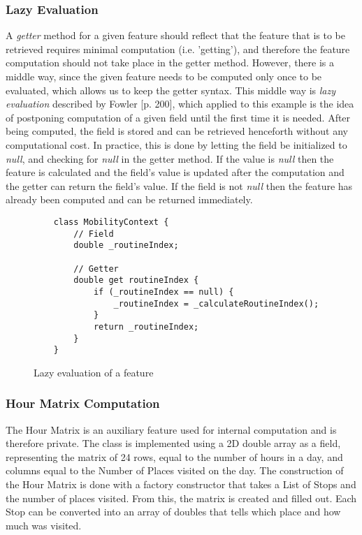 \subsubsection{Lazy Evaluation}
A \textit{getter} method for a given feature should reflect that the feature that is to be retrieved requires minimal computation (i.e. 'getting'), and therefore the feature computation should not take place in the getter method. However, there is a middle way, since the given feature needs to be computed only once to be evaluated, which allows us to keep the getter syntax. This middle way is \textit{lazy evaluation} described by Fowler \cite{fowler-PEEA} [p. 200], which applied to this example is the idea of postponing computation of a given field until the first time it is needed. After being computed, the field is stored and can be retrieved henceforth without any computational cost. In practice, this is done by letting the field be initialized to \textit{null}, and checking for \textit{null} in the getter method. If the value is \textit{null} then the feature is calculated and the field's value is updated after the computation and the getter can return the field's value. If the field is not \textit{null} then the feature has already been computed and can be returned immediately.

\begin{figure}
    \centering
    \begin{verbatim}
    class MobilityContext {
        // Field
        double _routineIndex;
        
        // Getter
        double get routineIndex {
            if (_routineIndex == null) {
                _routineIndex = _calculateRoutineIndex();
            }
            return _routineIndex;
        }
    }
    \end{verbatim}
    \caption{Lazy evaluation of a feature}
    \label{fig:lazy-evaluation}
\end{figure}

\subsubsection{Hour Matrix Computation}
The Hour Matrix is an auxiliary feature used for internal computation and is therefore private. The class is implemented using a 2D double array as a field, representing the matrix of 24 rows, equal to the number of hours in a day, and columns equal to the Number of Places visited on the day. The construction of the Hour Matrix is done with a factory constructor that takes a List of Stops and the number of places visited. From this, the matrix is created and filled out. Each Stop can be converted into an array of doubles that tells which place and how much was visited.

